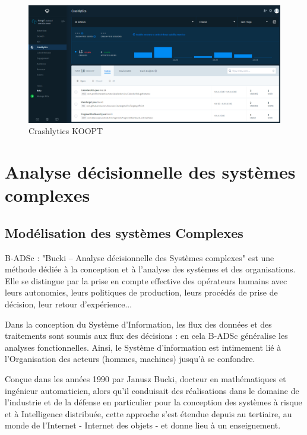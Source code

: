\begin{figure}[H]
\begin{center}
\includegraphics[width=1\linewidth]{images/crashlytics}
\end{center}
\caption{Crashlytics KOOPT}
\end{figure}

\section{Analyse décisionnelle des systèmes complexes}

\subsection{Modélisation des systèmes Complexes}

B-ADSc : "Bucki – Analyse décisionnelle des Systèmes complexes" est une méthode dédiée à la conception et à l’analyse des systèmes et des organisations. Elle se distingue par la prise en compte effective des opérateurs humains avec leurs autonomies, leurs politiques de production, leurs procédés de prise de décision, leur retour d’expérience...

Dans la conception du Système d'Information, les flux des données et des traitements sont soumis aux flux des décisions : en cela B-ADSc généralise les analyses fonctionnelles. Ainsi, le Système d’information est intimement lié à l’Organisation des acteurs (hommes, machines) jusqu'à se confondre.

Conçue dans les années 1990 par Janusz Bucki, docteur en mathématiques et ingénieur automaticien, alors qu’il conduisait des réalisations dans le domaine de l’industrie et de la défense en particulier pour la conception des systèmes à risque et à Intelligence distribuée, cette approche s’est étendue depuis au tertiaire, au monde de l'Internet - Internet des objets - et donne lieu à un enseignement.

